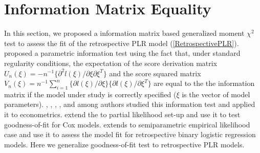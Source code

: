 \documentclass[11pt]{article}
\theoremstyle{plain}
\theoremstyle{definition}
\theoremstyle{remark}
\theoremstyle{definition}
\begin{document}
\section{Information Matrix Equality}\label{sec3}
In this section, we proposed a information matrix based generalized moment $\chi^2$ test to assess the fit of the retrospective PLR model (\ref{RetrospectivePLR}). \cite{White-1982} proposed a parametric information test using the fact that, under standard regularity conditions, the expectation of the score derivation matrix $U_n(\xi)=-n^{-1}\{\partial^2l(\xi)/\partial \xi \partial\xi^T\}$ and the score squared matrix $V_n(\xi)=n^{-1}\sum_{i=1}^n\{\partial l(\xi)/\partial\xi \}\{\partial l(\xi)/\partial\xi ^T \}$ are equal to the the information matrix if the model under study is correctly specified ($\xi$ is the vector of model parameters). \cite{Hausman-SpecificationTest-Economitrica-1978}, \cite{Hausman-McFadden-Specification-GLM-Economitica-1984}, \cite{Holly-SpecificationTest-Economitrica-1982}, \cite{Newey-GMSpecification-J-Economics-1985, Newey-MLE-CondMomentTest-Specification-Economitrica-1985}, and among authors studied this information test and applied it to econometrics. \cite{Lin-Wei-GOF-CoxModel-Sinica-1991} extend the \cite{White-1982} to partial likelihood set-up and use it to test goodness-of-fit for Cox models. \cite{ZhangBiao-Biometrika-2001} extends to semiparametric empirical likelihood case and use it to assess the model fit for retrospective binary logistic regression models. Here we  generalize \cite{ZhangBiao-Biometrika-2001} goodness-of-fit test to retrospective PLR models.
\end{document}
